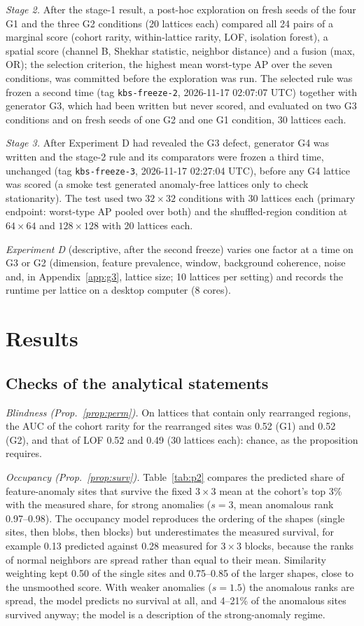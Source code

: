 \documentclass[preprint,review,12pt]{elsarticle}
\begin{document}
\emph{Stage 2.} After the stage-1 result, a post-hoc exploration on fresh seeds of the four G1 and the three G2 conditions (20 lattices each) compared all 24 pairs of a marginal score (cohort rarity, within-lattice rarity, LOF, isolation forest), a spatial score (channel B, Shekhar statistic, neighbor distance) and a fusion (max, OR); the selection criterion, the highest mean worst-type AP over the seven conditions, was committed before the exploration was run. The selected rule was frozen a second time (tag \texttt{kbs-freeze-2}, 2026-11-17 02:07:07 UTC) together with generator G3, which had been written but never scored, and evaluated on two G3 conditions and on fresh seeds of one G2 and one G1 condition, 30 lattices each.

\emph{Stage 3.} After Experiment D had revealed the G3 defect, generator G4 was written and the stage-2 rule and its comparators were frozen a third time, unchanged (tag \texttt{kbs-freeze-3}, 2026-11-17 02:27:04 UTC), before any G4 lattice was scored (a smoke test generated anomaly-free lattices only to check stationarity). The test used two $32\times32$ conditions with 30 lattices each (primary endpoint: worst-type AP pooled over both) and the shuffled-region condition at $64\times64$ and $128\times128$ with 20 lattices each.

\emph{Experiment D} (descriptive, after the second freeze) varies one factor at a time on G3 or G2 (dimension, feature prevalence, window, background coherence, noise and, in Appendix~\ref{app:g3}, lattice size; 10 lattices per setting) and records the runtime per lattice on a desktop computer (8 cores).



\section{Results}
\label{sec:results}
\subsection{Checks of the analytical statements}
\emph{Blindness (Prop.~\ref{prop:perm}).} On lattices that contain only rearranged regions, the AUC of the cohort rarity for the rearranged sites was 0.52 (G1) and 0.52 (G2), and that of LOF 0.52 and 0.49 (30 lattices each): chance, as the proposition requires.

\emph{Occupancy (Prop.~\ref{prop:surv}).} Table~\ref{tab:p2} compares the predicted share of feature-anomaly sites that survive the fixed $3\times3$ mean at the cohort's top 3\% with the measured share, for strong anomalies ($s=3$, mean anomalous rank 0.97--0.98). The occupancy model reproduces the ordering of the shapes (single sites, then blobs, then blocks) but underestimates the measured survival, for example 0.13 predicted against 0.28 measured for $3\times3$ blocks, because the ranks of normal neighbors are spread rather than equal to their mean. Similarity weighting kept 0.50 of the single sites and 0.75--0.85 of the larger shapes, close to the unsmoothed score. With weaker anomalies ($s=1.5$) the anomalous ranks are spread, the model predicts no survival at all, and 4--21\% of the anomalous sites survived anyway; the model is a description of the strong-anomaly regime.
\end{document}
